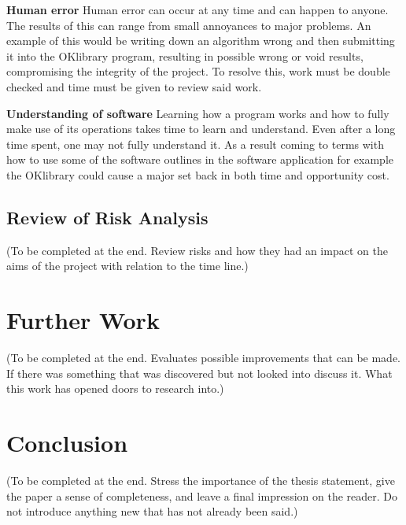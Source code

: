 \documentclass[11pt,a4paper]{report}
\begin{document}
\textbf{Human error}\newline
Human error can occur at any time and can happen to anyone. The results of this can range from small annoyances to major problems. An example of this would be writing down an algorithm wrong and then submitting it into the OKlibrary program, resulting in possible wrong or void results, compromising the integrity of the project. To resolve this, work must be double checked and time must be given to review said work.

\textbf{Understanding of software}\newline
Learning how a program works and how to fully make use of its operations takes time to learn and understand. Even after a long time spent, one may not fully understand it. As a result coming to terms with how to use some of the software outlines in the software application for example the OKlibrary could cause a major set back in both time and opportunity cost. 

\subsection{Review of Risk Analysis}
(To be completed at the end. Review risks and how they had an impact on the aims of the project with relation to the time line.)

\section{Further Work}
(To be completed at the end. Evaluates possible improvements that can be made. If there was something that was discovered but not looked into discuss it. What this work has opened doors to research into.)

\section{Conclusion}
(To be completed at the end. Stress the importance of the thesis statement, give the paper a sense of completeness, and
leave a final impression on the reader. Do not introduce anything new that has not already been said.)



\nocite{*}

\end{document}
